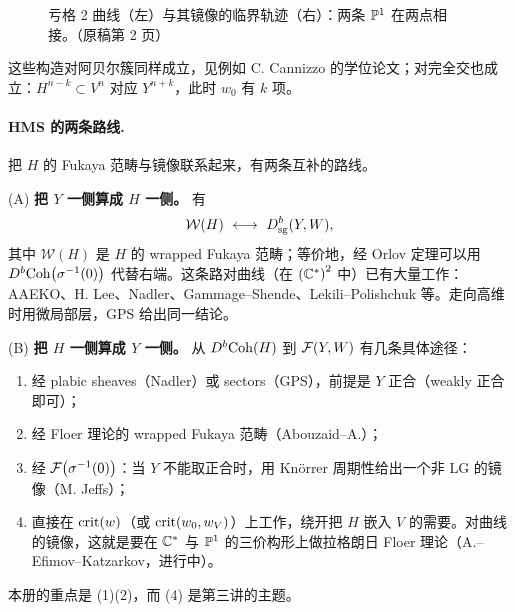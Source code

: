 \begin{figure}[htbp]
\centering
{}
\caption{亏格 2 曲线（左）与其镜像的临界轨迹（右）：两条 $\mathbb{P}^1$ 在两点相接。（原稿第 2 页）}
\label{fig:genus2}
\end{figure}

这些构造对阿贝尔簇同样成立，见例如 C. Cannizzo 的学位论文；对完全交也成立：$H^{n-k}\subset V^n$ 对应 $Y^{n+k}$，此时 $w_0$ 有 $k$ 项。

\paragraph{HMS 的两条路线.}
把 $H$ 的 Fukaya 范畴与镜像联系起来，有两条互补的路线。

(A) \textbf{把 $Y$ 一侧算成 $H$ 一侧。} 有
\[
\mathcal W(H)\ \longleftrightarrow\ \dsg(Y,W),
\]
其中 $\mathcal W(H)$ 是 $H$ 的 wrapped Fukaya 范畴；等价地，经 Orlov 定理可以用 $D^{b}\mathrm{Coh}\bigl(\sigma^{-1}(0)\bigr)$ 代替右端。这条路对曲线（在 $\left(\mathbb{C}^*\right)^2$ 中）已有大量工作：AAEKO、H. Lee、Nadler、Gammage--Shende、Lekili--Polishchuk 等。走向高维时用微局部层，GPS 给出同一结论。

(B) \textbf{把 $H$ 一侧算成 $Y$ 一侧。} 从 $D^{b}\mathrm{Coh}(H)$ 到 $\mathcal{F}(Y,W)$ 有几条具体途径：
\begin{enumerate}[label=(\arabic*)]
  \item 经 plabic sheaves（Nadler）或 sectors（GPS），前提是 $Y$ 正合（weakly 正合即可）；
  \item 经 Floer 理论的 wrapped Fukaya 范畴（Abouzaid--A.）；
  \item 经 $\mathcal{F}\bigl(\sigma^{-1}(0)\bigr)$：当 $Y$ 不能取正合时，用 Knörrer 周期性给出一个非 LG 的镜像（M. Jeffs）；
  \item 直接在 $\operatorname{crit}(w)$（或 $\operatorname{crit}(w_0,w_V)$）上工作，绕开把 $H$ 嵌入 $V$ 的需要。对曲线的镜像，这就是要在 $\mathbb{C}^*$ 与 $\mathbb{P}^1$ 的三价构形上做拉格朗日 Floer 理论（A.--Efimov--Katzarkov，进行中）。
\end{enumerate}
本册的重点是 (1)(2)，而 (4) 是第三讲的主题。


